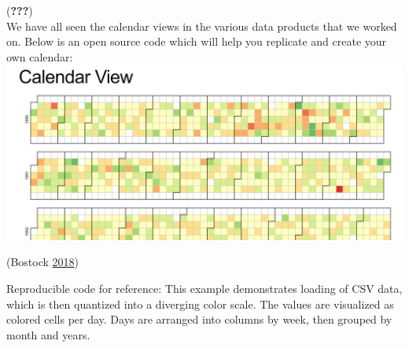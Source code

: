 \documentclass[]{book}
\theoremstyle{definition}
\theoremstyle{definition}
\theoremstyle{definition}
\theoremstyle{remark}
\begin{document}
({\textbf{???}})\\
We have all seen the calendar views in the various data products that we
worked on. Below is an open source code which will help you replicate
and create your own calendar: \includegraphics{images/CalendarView.jpg}

(Bostock \protect\hyperlink{ref-CalendarView}{2018})

Reproducible code for reference: This example demonstrates loading of
CSV data, which is then quantized into a diverging color scale. The
values are visualized as colored cells per day. Days are arranged into
columns by week, then grouped by month and years.
\end{document}
